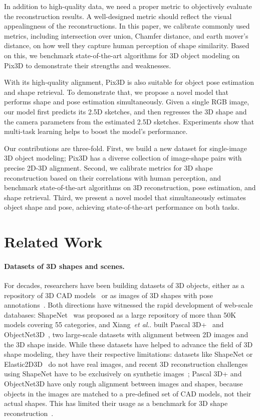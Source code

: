 \documentclass[10pt,twocolumn,letterpaper]{article}
\makeatletter
\DeclareRobustCommand\onedot{\futurelet\@let@token\@onedot}
\def\@onedot{\ifx\@let@token.\else.\null\fi\xspace}
\def\etal{\emph{et al}\onedot}
\newcommand{\data}{Pix3D\xspace}
\makeatother
\begin{document}
In addition to high-quality data, we need a proper metric to objectively evaluate the reconstruction results. A well-designed metric should reflect the visual appealingness of the reconstructions. In this paper, we calibrate commonly used metrics, including intersection over union, Chamfer distance, and earth mover's distance, on how well they capture human perception of shape similarity. Based on this, we benchmark state-of-the-art algorithms for 3D object modeling on \data to demonstrate their strengths and weaknesses.

With its high-quality alignment, Pix3D is also suitable for object pose estimation and shape retrieval. To demonstrate that, we propose a novel model that performs shape and pose estimation simultaneously. Given a single RGB image, our model first predicts its 2.5D sketches, and then regresses the 3D shape and the camera parameters from the estimated 2.5D sketches. Experiments show that multi-task learning helps to boost the model's performance. 

Our contributions are three-fold. First, we build a new dataset for single-image 3D object modeling; \data has a diverse collection of image-shape pairs with precise 2D-3D alignment. Second, we calibrate metrics for 3D shape reconstruction based on their correlations with human perception, and benchmark state-of-the-art algorithms on 3D reconstruction, pose estimation, and shape retrieval. Third, we present a novel model that simultaneously estimates object shape and pose, achieving state-of-the-art performance on both tasks. \section{Related Work}
\label{sec:related}

\paragraph{Datasets of 3D shapes and scenes.}

For decades, researchers have been building datasets of 3D objects, either as a repository of 3D CAD models~\cite{bogo2014faust,bronstein2008numerical,Shilane2004princeton} or as images of 3D shapes with pose annotations~\cite{Leibe2003Analyzing,Savarese20073D}. Both directions have witnessed the rapid development of web-scale databases: ShapeNet~\cite{Chang2015Shapenet:} was proposed as a large repository of more than 50K models covering 55 categories, and Xiang~\etal built Pascal 3D+~\cite{Xiang2014PASCAL:} and ObjectNet3D~\cite{Xiang2016Objectnet3d:}, two large-scale datasets with alignment between 2D images and the 3D shape inside. While these datasets have helped to advance the field of 3D shape modeling, they have their respective limitations: datasets like ShapeNet or Elastic2D3D~\cite{lahner2016efficient} do not have real images, and recent 3D reconstruction challenges using ShapeNet have to be exclusively on synthetic images~\cite{yi2017large}; Pascal 3D+ and ObjectNet3D have only rough alignment between images and shapes, because objects in the images are matched to a pre-defined set of CAD models, not their actual shapes. This has limited their usage as a benchmark for 3D shape reconstruction~\cite{Tulsiani2017Multi}. 
\end{document}
